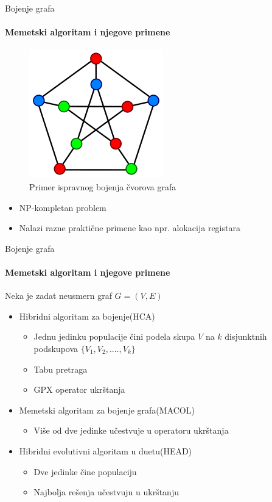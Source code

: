 \documentclass{beamer}
\begin{document}
\begin{frame}[fragile]{Bojenje grafa}
  \framesubtitle{Memetski algoritam i njegove primene}
    \begin{figure}[h!]
     	\centering
     	\includegraphics[scale=0.5]{bojene_grafa1}
        \caption{Primer ispravnog bojenja čvorova grafa}
    \end{figure}
    
    \begin{itemize}
        \item NP-kompletan problem
        \item Nalazi razne praktične primene kao npr. alokacija registara
    \end{itemize}
\end{frame}



\begin{frame}[fragile]{Bojenje grafa}
  \framesubtitle{Memetski algoritam i njegove primene}

Neka je zadat neusmern graf $G = (V, E)$

   \begin{itemize}
    \item{Hibridni algoritam za bojenje(HCA)}
        \begin{itemize}
            \item Jednu jedinku populacije čini podela skupa $V$ na $k$  disjunktnih podskupova $\{V_1, V_2, ...., V_k\}$
            \item Tabu pretraga
            \item GPX operator ukrštanja
        \end{itemize}
    \item{Memetski algoritam za bojenje grafa(MACOL)}
        \begin{itemize}
            \item Više od dve jedinke učestvuje u operatoru ukrštanja
        \end{itemize}
    \item{Hibridni evolutivni algoritam u duetu(HEAD)}
        \begin{itemize}
            \item Dve jedinke čine populaciju
            \item Najbolja rešenja učestvuju u ukrštanju
        \end{itemize}
  \end{itemize}
  

\end{frame}
\end{document}
